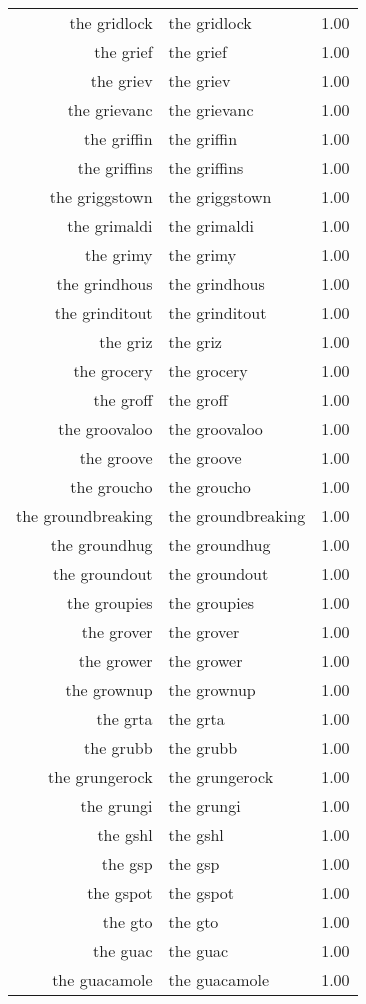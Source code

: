 \begin{table}[ht]
\begin{tabular}{rlr}
  the gridlock & the gridlock & 1.00 \\ 
  the grief & the grief & 1.00 \\ 
  the griev & the griev & 1.00 \\ 
  the grievanc & the grievanc & 1.00 \\ 
  the griffin & the griffin & 1.00 \\ 
  the griffins & the griffins & 1.00 \\ 
  the griggstown & the griggstown & 1.00 \\ 
  the grimaldi & the grimaldi & 1.00 \\ 
  the grimy & the grimy & 1.00 \\ 
  the grindhous & the grindhous & 1.00 \\ 
  the grinditout & the grinditout & 1.00 \\ 
  the griz & the griz & 1.00 \\ 
  the grocery & the grocery & 1.00 \\ 
  the groff & the groff & 1.00 \\ 
  the groovaloo & the groovaloo & 1.00 \\ 
  the groove & the groove & 1.00 \\ 
  the groucho & the groucho & 1.00 \\ 
  the groundbreaking & the groundbreaking & 1.00 \\ 
  the groundhug & the groundhug & 1.00 \\ 
  the groundout & the groundout & 1.00 \\ 
  the groupies & the groupies & 1.00 \\ 
  the grover & the grover & 1.00 \\ 
  the grower & the grower & 1.00 \\ 
  the grownup & the grownup & 1.00 \\ 
  the grta & the grta & 1.00 \\ 
  the grubb & the grubb & 1.00 \\ 
  the grungerock & the grungerock & 1.00 \\ 
  the grungi & the grungi & 1.00 \\ 
  the gshl & the gshl & 1.00 \\ 
  the gsp & the gsp & 1.00 \\ 
  the gspot & the gspot & 1.00 \\ 
  the gto & the gto & 1.00 \\ 
  the guac & the guac & 1.00 \\ 
  the guacamole & the guacamole & 1.00 \\ 

\end{tabular}
\end{table}
